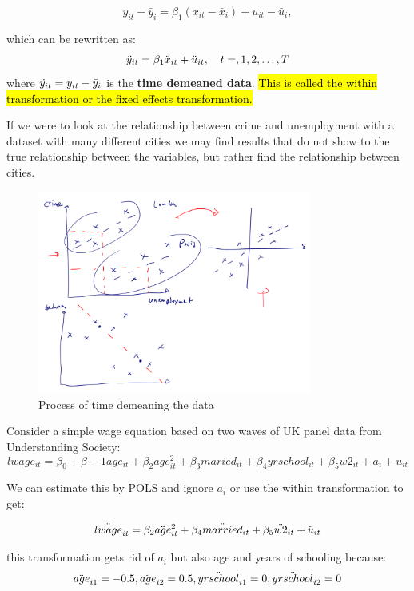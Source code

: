 \documentclass[11pt]{article}
\begin{document}
 \[y_{it} - \bar{y}_i = \beta_1 (x_{it} - \bar{x}_i) + u_{it} - \bar{u}_i,\]

 which can be rewritten as:
 \begin{equation}
     \label{first difference base equation}
     \Ddot{y}_{it} = \beta_1 \Ddot{x}_{it} + \Ddot{u}_{it}, \quad t=,1,2,\ldots,T
 \end{equation}
 where $\Ddot{y}_{it} = y_{it} - \bar{y}_i$ is the \textbf{time demeaned data}. \hl{This is called the within transformation or the fixed effects transformation.}

 \begin{example}
 If we were to look at the relationship between crime and unemployment with a dataset with many different cities we may find results that do not show to the true relationship between the variables, but rather find the relationship between cities.
 \end{example}
\begin{figure}[ht]
    \centering
    \includegraphics[width=9cm]{photos/fixed effects diagram.png}
    \caption{Process of time demeaning the data}
    \label{fig:fixed effects diagram}
\end{figure}


\begin{example}
    Consider a simple wage equation based on two waves of UK panel data from Understanding Society:
    \[lwage_{it} = \beta_0 + \beta-1 age_{it} + \beta_2 age^2_{it} + \beta_3 maried_{it} + \beta_4 yrschool_{it} + \beta_5 w2_{it} + a_i + u_{it}\]

    We can estimate this by POLS and ignore $a_i$ or use the within transformation to get:
    
    \[\Ddot{lwage}_{it} = \beta_2 \Ddot{age}^2_{it} + \beta_4 \Ddot{married}_{it} + \beta_5 \Ddot{w2}_{it} + \Ddot{u}_{it}\]

    \begin{note}
        this transformation gets rid of $a_i$ but also age and years of schooling because:
        \[\Ddot{age}_{i1} = -0.5, \Ddot{age}_{i2} = 0.5, \Ddot{yrschool}_{i1} = 0, \Ddot{yrschool}_{i2} = 0\]
    \end{note}

\end{example}
\end{document}
